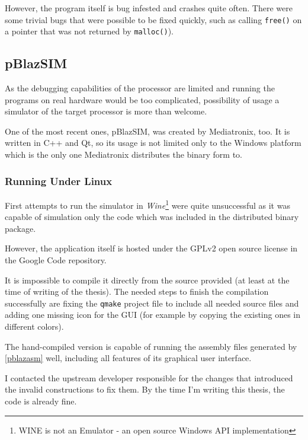         However, the program itself is bug infested and crashes quite often. There were some trivial bugs that were possible to be fixed quickly, such as calling \texttt{free()} on a pointer that was not returned by \texttt{malloc()}).

        \subsection{pBlazSIM}\label{pblazsim}

        As the debugging capabilities of the processor are limited and running the programs on real hardware would be too complicated, possibility of usage a simulator of the target processor is more than welcome.

        One of the most recent ones, pBlazSIM, was created by Mediatronix, too. It is written in C++ and Qt, so its usage is not limited only to the Windows platform which is the only one Mediatronix distributes the binary form to.

            \subsubsection{Running Under Linux}

            First attempts to run the simulator in \emph{Wine}\footnote{WINE is not an Emulator - an open source Windows API implementation} were quite unsuccessful as it was capable of simulation only the code which was included in the distributed binary package.

            However, the application itself is hosted under the GPLv2 open source license in the Google Code repository. 

            It is impossible to compile it directly from the source provided (at least at the time of writing of the thesis). The needed steps to finish the compilation successfully are fixing the \texttt{qmake} project file to include all needed source files and adding one missing icon for the GUI (for example by copying the existing ones in different colors).

            The hand-compiled version is capable of running the assembly files generated by \ref{pblazasm} well, including all features of its graphical user interface.

            I contacted the upstream developer responsible for the changes that introduced the invalid constructions to fix them. By the time I'm writing this thesis, the code is already fine.

